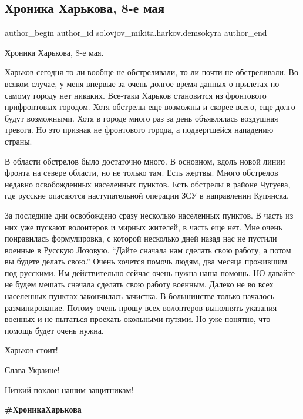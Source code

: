  
 
 
 
 
 
\subsection{Хроника Харькова, 8-е мая}
\label{sec:08_05_2022.fb.solovjov_mikita.harkov.demsokyra.1.hronika}
 
\ifcmt
 author_begin
   author_id solovjov_mikita.harkov.demsokyra
 author_end
\fi

Хроника Харькова, 8-е мая. 

Харьков сегодня то ли вообще не обстреливали, то ли почти не обстреливали. Во
всяком случае, у меня впервые за очень долгое время данных о прилетах по самому
городу нет никаких. Все-таки Харьков становится из фронтового прифронтовых
городом. Хотя обстрелы еще возможны и скорее всего, еще долго будут возможными.
Хотя в городе много раз за день объявлялась воздушная тревога. Но это признак
не фронтового города, а подвергшейся нападению страны. 

В области обстрелов было достаточно много. В основном, вдоль новой линии фронта
на севере области, но не только там. Есть жертвы. Много обстрелов недавно
освобожденных населенных пунктов. Есть обстрелы в районе Чугуева, где русские
опасаются наступательной операции ЗСУ в направлении Купянска. 

За последние дни освобождено сразу несколько населенных пунктов. В часть из них
уже пускают волонтеров и мирных жителей, в часть еще нет. Мне очень понравилась
формулировка, с которой несколько дней назад нас не пустили военные в Русскую
Лозовую. \enquote{Дайте сначала нам сделать свою работу, а потом вы будете делать
свою.} Очень хочется помочь людям, два месяца прожившим под русскими. Им
действительно сейчас очень нужна наша помощь. НО давайте не будем мешать
сначала сделать свою работу военным. Далеко не во всех населенных пунктах
закончилась зачистка. В большинстве только началось разминирование. Потому
очень прошу всех волонтеров выполнять указания военных и не пытаться проехать
окольными путями. Но уже понятно, что помощь будет очень нужна. 

Харьков стоит!

Слава Украине!

Низкий поклон нашим защитникам!

\textbf{\#ХроникаХарькова}
